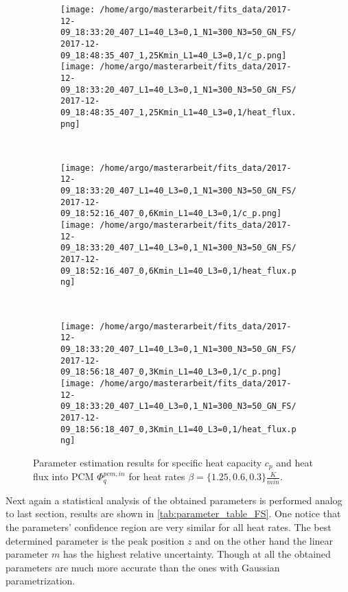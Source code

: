 \documentclass{scrartcl}[12pt, halfparskip]
\numberwithin{equation}{section}
\numberwithin{figure}{section}
\numberwithin{table}{section}
\begin{document}
\begin{figure}[H]
	\begin{subfigure}{1.\textwidth}
		\texttt{[image: /home/argo/masterarbeit/fits\_data/2017-12-09\_18:33:20\_407\_L1=40\_L3=0,1\_N1=300\_N3=50\_GN\_FS/2017-12-09\_18:48:35\_407\_1,25Kmin\_L1=40\_L3=0,1/c\_p.png]}
		\texttt{[image: /home/argo/masterarbeit/fits\_data/2017-12-09\_18:33:20\_407\_L1=40\_L3=0,1\_N1=300\_N3=50\_GN\_FS/2017-12-09\_18:48:35\_407\_1,25Kmin\_L1=40\_L3=0,1/heat\_flux.png]}
	\end{subfigure} \\[1ex]
	
	\begin{subfigure}{1.\textwidth}
		\texttt{[image: /home/argo/masterarbeit/fits\_data/2017-12-09\_18:33:20\_407\_L1=40\_L3=0,1\_N1=300\_N3=50\_GN\_FS/2017-12-09\_18:52:16\_407\_0,6Kmin\_L1=40\_L3=0,1/c\_p.png]}
		\texttt{[image: /home/argo/masterarbeit/fits\_data/2017-12-09\_18:33:20\_407\_L1=40\_L3=0,1\_N1=300\_N3=50\_GN\_FS/2017-12-09\_18:52:16\_407\_0,6Kmin\_L1=40\_L3=0,1/heat\_flux.png]}
	\end{subfigure} \\[1ex]
	
	\begin{subfigure}{1.\textwidth}
		\texttt{[image: /home/argo/masterarbeit/fits\_data/2017-12-09\_18:33:20\_407\_L1=40\_L3=0,1\_N1=300\_N3=50\_GN\_FS/2017-12-09\_18:56:18\_407\_0,3Kmin\_L1=40\_L3=0,1/c\_p.png]}
		\texttt{[image: /home/argo/masterarbeit/fits\_data/2017-12-09\_18:33:20\_407\_L1=40\_L3=0,1\_N1=300\_N3=50\_GN\_FS/2017-12-09\_18:56:18\_407\_0,3Kmin\_L1=40\_L3=0,1/heat\_flux.png]}
	\end{subfigure}
	\caption{Parameter estimation results for specific heat capacity $c_p$ and heat flux into PCM $\varPhi_q^{pcm,in}$ for heat rates $\beta=\{ 1.25, 0.6, 0.3 \} \frac{K}{min}$.}
	\label{fig:optim_c_p_heat_flux_FS_2}
\end{figure}

Next again a statistical analysis of the obtained parameters is performed analog to last section, results are shown in \cref{tab:parameter_table_FS}. One notice that the parameters' confidence region are very similar for all heat rates. The best determined parameter is the peak position $z$ and on the other hand the linear parameter $m$ has the highest relative uncertainty. Though at all the obtained parameters are much more accurate than the ones with Gaussian parametrization. 
\end{document}
